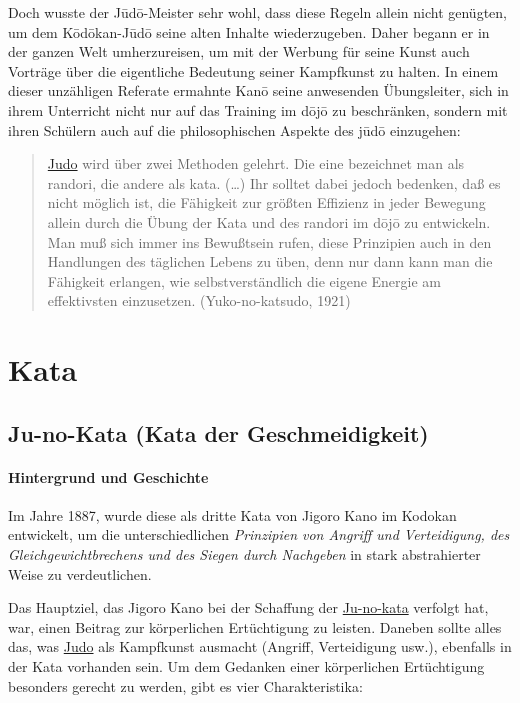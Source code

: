 \documentclass[justified, a4paper, notitlepage, captions=tableheading, nobib]{tufte-handout}
\begin{document}
Doch wusste der Jūdō-Meister sehr wohl, dass diese Regeln allein nicht genügten, um dem Kōdōkan-Jūdō seine alten Inhalte wiederzugeben. Daher begann er in der ganzen Welt umherzureisen, um mit der Werbung für seine Kunst auch Vorträge über die eigentliche Bedeutung seiner Kampfkunst zu halten. In einem dieser unzähligen Referate ermahnte Kanō seine anwesenden Übungsleiter, sich in ihrem Unterricht nicht nur auf das Training im dōjō zu beschränken, sondern mit ihren Schülern auch auf die philosophischen Aspekte des jūdō einzugehen:

\begin{quote}
\hyperref[org60aba15]{Judo} wird über zwei Methoden gelehrt. Die eine bezeichnet man als randori, die andere als kata. (\ldots{}) Ihr solltet dabei jedoch bedenken, daß es nicht möglich ist, die Fähigkeit zur größten Effizienz in jeder Bewegung allein durch die Übung der Kata und des randori im dōjō zu entwickeln. Man muß sich immer ins Bewußtsein rufen, diese Prinzipien auch in den Handlungen des täglichen Lebens zu üben, denn nur dann kann man die Fähigkeit erlangen, wie selbstverständlich die eigene Energie am effektivsten einzusetzen. (Yuko-no-katsudo, 1921) 
\end{quote}


\newpage
\section{Kata }
\label{sec:org5362cda}
\subsection{\label{orgd6be93b}Ju-no-Kata (Kata der Geschmeidigkeit)}
\label{sec:orgf7d9d83}
\paragraph{Hintergrund und Geschichte}
\label{sec:org6479240}
Im Jahre 1887, wurde diese als dritte Kata von Jigoro Kano im Kodokan entwickelt, um die unterschiedlichen \emph{Prinzipien von Angriff und Verteidigung, des Gleichgewichtbrechens und des Siegen durch Nachgeben} in stark abstrahierter Weise zu verdeutlichen. 

Das Hauptziel, das Jigoro Kano bei der Schaffung der \hyperref[orgd6be93b]{Ju-no-kata} verfolgt hat, war, einen Beitrag zur körperlichen Ertüchtigung zu leisten. 
Daneben sollte alles das, was \hyperref[org60aba15]{Judo} als Kampfkunst ausmacht (Angriff, Verteidigung usw.), ebenfalls in der Kata vorhanden sein. 
Um dem Gedanken einer körperlichen Ertüchtigung besonders gerecht zu werden, gibt es vier Charakteristika:
\end{document}
